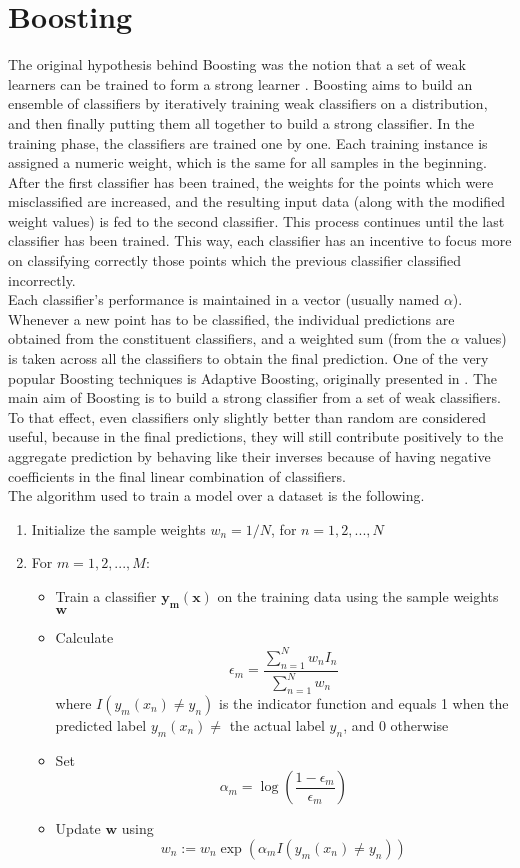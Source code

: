 \section{Boosting}
The original hypothesis behind Boosting was the notion that a set of weak learners can be trained to form a strong learner \cite{kearns1988thoughts}. Boosting aims to build an ensemble of classifiers by iteratively training weak classifiers on a distribution, and then finally putting them all together to build a strong classifier. In the training phase, the classifiers are trained one by one. Each training instance is assigned a numeric weight, which is the same for all samples in the beginning. After the first classifier has been trained, the weights for the points which were misclassified are increased, and the resulting input data (along with the modified weight values) is fed to the second classifier. This process continues until the last classifier has been trained. This way, each classifier has an incentive to focus more on classifying correctly those points which the previous classifier classified incorrectly.\\

Each classifier's performance is maintained in a vector (usually named $\alpha$). Whenever a new point has to be classified, the individual predictions are obtained from the constituent classifiers, and a weighted sum (from the $\alpha$ values) is taken across all the classifiers to obtain the final prediction. One of the very popular Boosting techniques is Adaptive Boosting, originally presented in \cite{freund1995desicion}. The main aim of Boosting is to build a strong classifier from a set of weak classifiers. To that effect, even classifiers only slightly better than random are considered useful, because in the final predictions, they will still contribute positively to the aggregate prediction by behaving like their inverses because of having negative coefficients in the final linear combination of classifiers.\\

The algorithm used to train a model over a dataset is the following.

\begin{enumerate}
    \item{Initialize the sample weights $w_n = 1/N$, for $n = 1, 2, ..., N$}
    \item{
    For $m = 1, 2, ..., M$:
    \begin{itemize}
        \item{Train a classifier $\mathbf{y_m(x)}$ on the training data using the sample weights $\mathbf{w}$}
        \item{Calculate $$\epsilon_m = \frac{\displaystyle \sum_{n = 1}^{N} w_n I_n}{\displaystyle \sum_{n = 1}^{N} w_n}$$ where $I(y_m(x_n) \neq y_n)$ is the indicator function and equals 1 when the predicted label $y_m(x_n) \neq$ the actual label $y_n$, and 0 otherwise}
        \item{Set $$\alpha_m = \log(\frac{1 - \epsilon_m}{\epsilon_m})$$}
        \item{Update $\mathbf{w}$ using $$w_n := w_n \exp(\alpha_m I(y_m(x_n) \neq y_n))$$}
    \end{itemize}
    }
\end{enumerate}

